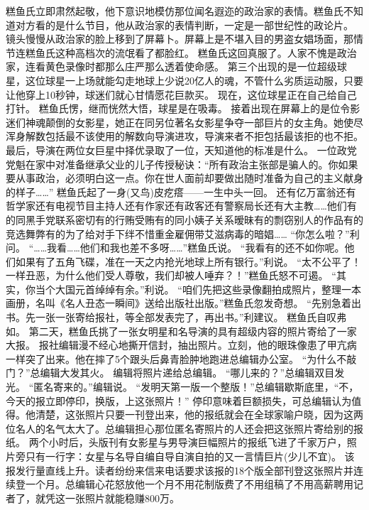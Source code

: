 \documentclass[a4paper,12pt,UTF8,twoside]{ctexbook}
\begin{document}
        糕鱼氏立即肃然起敬，他下意识地模仿那位闻名遐迩的政治家的表情。糕鱼氏不知道对方看的是什么节目，他从政治家的表情判断，一定是一部世纪性的政论片。 
        镜头慢慢从政治家的脸上移到了屏幕卜。屏幕上是不堪入目的男盗女娼场面，那情节连糕鱼氏这种高档次的流氓看了都脸红。 
        糕鱼氏这回真服了。人家不愧是政治家，连看黄色录像时都那么庄严那么透着使命感。 
        第三个出现的是一位超级球星，这位球星一上场就能勾走地球上少说20亿人的魂，不管什么劣质运动服，只要让他穿上10秒钟，球迷们就心甘情愿花巨款买。 
        现在，这位球星正在自己给自己打针。 
        糕鱼氏愣，继而恍然大悟，球星是在吸毒。 
        接着出现在屏幕上的是位令影迷们神魂颠倒的女影星，她正在同另位著名女影星争夺一部巨片的女主角。她使尽浑身解数包括最不该使用的解数向导演进攻，导演来者不拒包括最该拒的也不拒。最后，导演在两位女巨星中择优录取了一位，天知道他的标准是什么。 
        一位政党党魁在家中对准备继承父业的儿子传授秘诀：“所有政治主张部是骗人的。你如果要从事政治，必须明白这一点。你在世人面前却要做出随时准备为自己的主义献身的样子……” 
        糕鱼氏起了一身(又鸟)皮疙瘩——一生中头一回。 
        还有亿万富翁还有哲学家还有电视节目主持人还有作家还有政客还有警察局长还有大主教……他们有的同黑手党联系密切有的行贿受贿有的同小姨子关系暧昧有的剽窃别人的作品有的竞选舞弊有的为了给对手下绊不惜重金雇佣带艾滋病毒的暗娼…… 
        “你怎么啦？”利问。 
        “……我看……他们和我也差不多呀……”糕鱼氏说。 
        “我看有的还不如你呢。他们如果有了五角飞碟，准在一天之内抢光地球上所有银行。”利说。 
        “太不公平了！一样丑恶，为什么他们受人尊敬，我们却被人唾弃？！”糕鱼氏怒不可遏。 
        “其实，你当个大国元首绰绰有余。”利说。 
        “咱们先把这些录像翻拍成照片，整理一本画册，名叫《名人丑态一瞬间》送给出版社出版。”糕鱼氏忽发奇想。 
        “先别急着出书。先一张一张寄给报社，等全部发表完了，再出书。”利建议。 
        糕鱼氏自叹弗如。 
        第二天，糕鱼氏挑了一张女明星和名导演的具有超级内容的照片寄给了一家大报。 
        报社编辑漫不经心地撕开信封，抽出照片。立刻，他的眼珠像患了甲亢病一样突了出来。他在摔了5个跟头后鼻青脸肿地跑进总编辑办公室。 
        “为什么不敲门？”总编辑大发其火。 
        编辑将照片递给总编辑。 
        “哪儿来的？”总编辑双目发光。 
        “匿名寄来的。”编辑说。 
        “发明天第一版一个整版！”总编辑歇斯底里，“不，今天的报立即停印，换版，上这张照片！” 
        停印意味着巨额损失，可总编辑认为值得。他清楚，这张照片只要一刊登出来，他的报纸就会在全球家喻户晓，因为这两位名人的名气太大了。总编辑担心那位匿名寄照片的人还会把这张照片寄给别的报纸。 
        两个小时后，头版刊有女影星与男导演巨幅照片的报纸飞进了千家万户，照片旁只有一行字：女星与名导自编自导自演自拍的又一言情巨片(少儿不宜)。 
        该报发行量直线上升。读者纷纷来信来电话要求该报的18个版全部刊登这张照片并连续登一个月。总编辑心花怒放他一个月不用花制版费了不用组稿了不用高薪聘用记者了，就凭这一张照片就能稳赚800万。 
\end{document}
